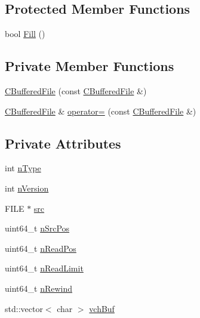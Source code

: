 \subsection*{Protected Member Functions}
\begin{DoxyCompactItemize}
\item 
bool \mbox{\hyperlink{class_c_buffered_file_a2c93fc60c4460bd1ccf90922646b19b8}{Fill}} ()
\end{DoxyCompactItemize}
\subsection*{Private Member Functions}
\begin{DoxyCompactItemize}
\item 
\mbox{\hyperlink{class_c_buffered_file_a9d6a1d43da82fe5fb30500cd56032134}{C\+Buffered\+File}} (const \mbox{\hyperlink{class_c_buffered_file}{C\+Buffered\+File}} \&)
\item 
\mbox{\hyperlink{class_c_buffered_file}{C\+Buffered\+File}} \& \mbox{\hyperlink{class_c_buffered_file_a7b7b4419c88fb710eab6c9ccce3d3414}{operator=}} (const \mbox{\hyperlink{class_c_buffered_file}{C\+Buffered\+File}} \&)
\end{DoxyCompactItemize}
\subsection*{Private Attributes}
\begin{DoxyCompactItemize}
\item 
int \mbox{\hyperlink{class_c_buffered_file_a121e3ede0af49d4711dc4934d252f842}{n\+Type}}
\item 
int \mbox{\hyperlink{class_c_buffered_file_afdfff4bdd212f72580b1c7c02bef554a}{n\+Version}}
\item 
F\+I\+LE $\ast$ \mbox{\hyperlink{class_c_buffered_file_a85ed820b4e1a4c2d1ca983749044f172}{src}}
\item 
uint64\+\_\+t \mbox{\hyperlink{class_c_buffered_file_a9c12254ffa498eef11a41e3a5a02c313}{n\+Src\+Pos}}
\item 
uint64\+\_\+t \mbox{\hyperlink{class_c_buffered_file_ab8fd6b1adfed6b2364a97984d6dc336b}{n\+Read\+Pos}}
\item 
uint64\+\_\+t \mbox{\hyperlink{class_c_buffered_file_a14409b620943fcc88a114dcbe417f77c}{n\+Read\+Limit}}
\item 
uint64\+\_\+t \mbox{\hyperlink{class_c_buffered_file_a3352d0e0d6a5758961f2fafc950fb37d}{n\+Rewind}}
\item 
std\+::vector$<$ char $>$ \mbox{\hyperlink{class_c_buffered_file_a50fde609bd4dfeeb7c2ecf4f0d75e789}{vch\+Buf}}
\end{DoxyCompactItemize}


